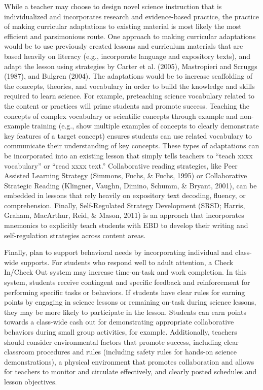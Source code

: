 \documentclass[11.5pt]{sig-alternate} %
\begin{document}
\begin{large}
While a teacher may choose to design novel science instruction that is individualized and incorporates research and evidence-based practice, the practice of making curricular adaptations to existing material is most likely the most efficient and parsimonious route. One approach to making curricular adaptations would be to use previously created lessons and curriculum materials that are based heavily on literacy (e.g., incorporate language and expository texts), and adapt the lesson using strategies by Carter et al. (2005), Mastropieri and Scruggs (1987), and Bulgren (2004). The adaptations would be to increase scaffolding of the concepts, theories, and vocabulary in order to build the knowledge and skills required to learn science. For example, preteaching science vocabulary related to the content or practices will prime students and promote success. Teaching the concepts of complex vocabulary or scientific concepts through example and non-example training (e.g., show multiple examples of concepts to clearly demonstrate key features of a target concept) ensures students can use related vocabulary to communicate their understanding of key concepts. These types of adaptations can be incorporated into an existing lesson that simply tells teachers to “teach xxxx vocabulary” or “read xxxx text.” Collaborative reading strategies, like Peer Assisted Learning Strategy (Simmons, Fuchs, \& Fuchs, 1995) or Collaborative Strategic Reading (Klingner, Vaughn, Dimino, Schumm, \& Bryant, 2001), can be embedded in lessons that rely heavily on expository text decoding, fluency, or comprehension. Finally, Self-Regulated Strategy Development (SRSD; Harris, Graham, MacArthur, Reid, \& Mason, 2011) is an approach that incorporates mnemonics to explicitly teach students with EBD to develop their writing and self-regulation strategies across content areas.

Finally, plan to support behavioral needs by incorporating individual and class-wide supports. For students who respond well to adult attention, a Check In/Check Out system may increase time-on-task and work completion. In this system, students receive contingent and specific feedback and reinforcement for performing specific tasks or behaviors. If students have clear rules for earning points by engaging in science lessons or remaining on-task during science lessons, they may be more likely to participate in the lesson. Students can earn points towards a class-wide cash out for demonstrating appropriate collaborative behaviors during small group activities, for example. Additionally, teachers should consider environmental factors that promote success, including clear classroom procedures and rules (including safety rules for hands-on science demonstrations), a physical environment that promotes collaboration and allows for teachers to monitor and circulate effectively, and clearly posted schedules and lesson objectives. 


\end{large}
\end{document}
